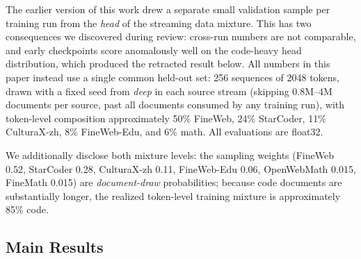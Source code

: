 \documentclass{article}
\begin{document}
The earlier version of this work drew a separate small validation sample per training run from the \emph{head} of the streaming data mixture. This has two consequences we discovered during review: cross-run numbers are not comparable, and early checkpoints score anomalously well on the code-heavy head distribution, which produced the retracted result below. All numbers in this paper instead use a single common held-out set: 256 sequences of 2048 tokens, drawn with a fixed seed from \emph{deep} in each source stream (skipping 0.8M--4M documents per source, past all documents consumed by any training run), with token-level composition approximately 50\% FineWeb, 24\% StarCoder, 11\% CulturaX-zh, 8\% FineWeb-Edu, and 6\% math. All evaluations are float32.

We additionally disclose both mixture levels: the sampling weights (FineWeb 0.52, StarCoder 0.28, CulturaX-zh 0.11, FineWeb-Edu 0.06, OpenWebMath 0.015, FineMath 0.015) are \emph{document-draw} probabilities; because code documents are substantially longer, the realized token-level training mixture is approximately 85\% code.

\subsection{Main Results}
\end{document}
